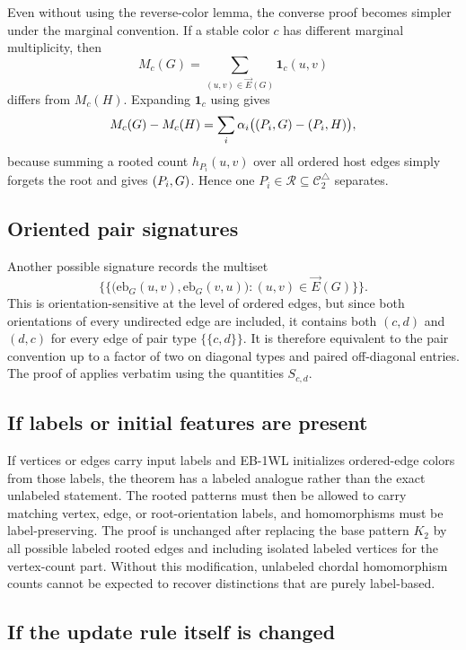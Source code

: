 \documentclass[11pt]{article}
\let\hom\relax
\DeclareMathOperator{\hom}{hom}
\newcommand{\cC}{\mathcal{C}}
\newcommand{\cR}{\mathcal{R}}
\newcommand{\vecE}{\overrightarrow{E}}
\newcommand{\mset}[1]{\{\!\{#1\}\!\}}
\begin{document}
Even without using the reverse-color lemma, the converse proof becomes simpler under the marginal convention.  If a stable color $c$ has different marginal multiplicity, then
\[
M_c(G)=\sum_{(u,v)\in\vecE(G)}\mathbf{1}_c(u,v)
\]
differs from $M_c(H)$.  Expanding $\mathbf{1}_c$ using  gives
\[
M_c(G)-M_c(H)=\sum_i\alpha_i\bigl(\hom(P_i,G)-\hom(P_i,H)\bigr),
\]
because summing a rooted count $h_{P_i}(u,v)$ over all ordered host edges simply forgets the root and gives $\hom(P_i,G)$.  Hence one $P_i\in\cR\subseteq\cC_2^\triangle$ separates.

\subsection{Oriented pair signatures}

Another possible signature records the multiset
\[
\mset{\bigl(\mathrm{eb}_G(u,v),\mathrm{eb}_G(v,u)\bigr):(u,v)\in\vecE(G)}.
\]
This is orientation-sensitive at the level of ordered edges, but since both orientations of every undirected edge are included, it contains both $(c,d)$ and $(d,c)$ for every edge of pair type $\mset{c,d}$.  It is therefore equivalent to the pair convention up to a factor of two on diagonal types and paired off-diagonal entries.  The proof of  applies verbatim using the quantities $S_{c,d}$.

\subsection{If labels or initial features are present}

If vertices or edges carry input labels and EB-1WL initializes ordered-edge colors from those labels, the theorem has a labeled analogue rather than the exact unlabeled statement.  The rooted patterns must then be allowed to carry matching vertex, edge, or root-orientation labels, and homomorphisms must be label-preserving.  The proof is unchanged after replacing the base pattern $K_2$ by all possible labeled rooted edges and including isolated labeled vertices for the vertex-count part.  Without this modification, unlabeled chordal homomorphism counts cannot be expected to recover distinctions that are purely label-based.

\subsection{If the update rule itself is changed}
\end{document}
